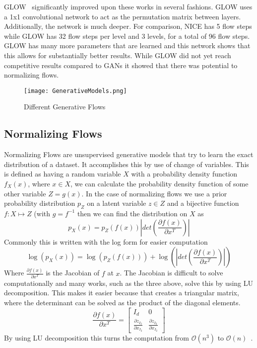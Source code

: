 GLOW~\cite{glow} significantly improved upon these works in several fashions.
GLOW uses a 1x1 convolutional network to act as the permutation matrix between
layers. Additionally, the network is much deeper. For comparison, NICE has 5
flow steps while GLOW has 32 flow steps per level and 3 levels, for a total of
96 flow steps. GLOW has many more parameters that are learned and this network
shows that this allows for substantially better results. While GLOW did not yet
reach competitive results compared to GANs it showed that there was potential to
normalizing flows.

\begin{figure}[ht]
\center\texttt{[image: GenerativeModels.png]}
\caption{Different Generative Flows~\cite{weng2018flow}}
\label{fig:gens}
\end{figure}

\subsection{Normalizing Flows}
Normalizing Flows are unsupervised generative models that try to learn the exact
distribution of a dataset. It accomplishes this by use of change of variables.
This is defined as having a random variable $X$ with a probability density
function $f_X(x)$, where $x\in X$, we can calculate the probability density
function of some other variable $Z=g(x)$. In the case of normalizing flows we
use a prior probability distribution $p_Z$ on a latent variable $z\in Z$ and a
bijective function $f: X\mapsto Z$ (with $g = f^{-1}$ then we can find the
distribution on $X$ as
\begin{equation}
    p_X(x) = p_Z(f(x))\left | det\left(\frac{\partial f(x)}{\partial x^T}
        \right)\right |
\end{equation}
Commonly this is written with the log form for easier computation
\begin{equation}
    \log(p_X(x)) = \log(p_Z(f(x))) + \log\left(\left| det \left(
            \frac{\partial f(x)}{\partial x^T} \right) \right | \right )
\end{equation}
Where $\frac{\partial f(x)}{\partial x^T}$ is the Jacobian of $f$ at $x$. The
Jacobian is difficult to solve computationally and many works, such as the three
above, solve this by using LU decomposition. This makes it easier because that
creates a triangular matrix, where the determinant can be solved as the product
of the diagonal elements. 
\begin{equation}
    \frac{\partial f(x)}{\partial x^T} = \begin{bmatrix} I_d & 0 \\ \frac{\partial
    z_{I_2}}{\partial x_{I_2}} & \frac{\partial z_{I_2}}{\partial
    x_{I_2}}\end{bmatrix}
\end{equation}
By using LU decomposition this turns the computation from $\mathcal{O}(n^3)$ to
$\mathcal{O}(n)$~\cite{glow}.

